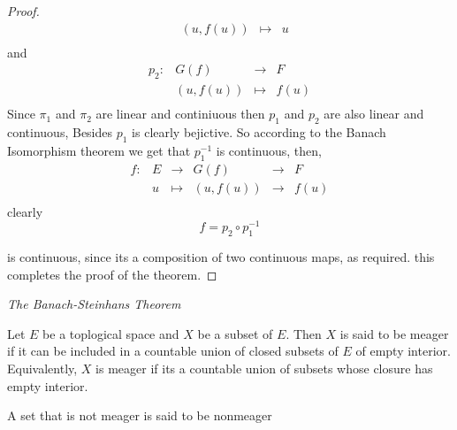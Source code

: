 \begin{proof}
\[\begin{array}{cccc}
           &  (u,f(u) )   & \longmapsto     & u \\ 
\end{array}
\]
and 
\[
\begin{array}{cccc}
      p_2 : &  G(f)   & \longrightarrow & F \\

           &  (u,f(u) )   & \longmapsto     & f(u)  \\ 
\end{array}
\]
Since $\pi _{1} $ and $\pi _{2} $ 
are linear and continiuous then $p_1 $ and $p_2 $ are 
also linear and continuous, Besides $p_1 $ is clearly
bejictive. So according to the Banach Isomorphism 
theorem we get that $p_{1}^{-1} $  is continuous, then,
\[
\begin{array}{cccccc}
	f : &  E  & \longrightarrow & G(f) &\longrightarrow & F  \\
	    &    u& \longmapsto     &  (u,f(u) )&\longrightarrow & f(u)\\ 
\end{array}
\]
clearly 
\[
f = p_{2} \circ  p_1^{-1}
\]

is continuous, since its a composition of two continuous maps,
as required. this completes the proof of the theorem.
\end{proof}
\begin{center}
	\it The Banach-Steinhans Theorem \normalfont
\end{center}
\begin{definition}
	Let $E $ be a toplogical space and $X $ be 
	a subset of $E $. Then $X $ is said to
	be meager if it can be included in a countable
	union of closed subsets of $E $ of empty interior. \\
	Equivalently, $X $ is meager if its a countable union of 
	subsets whose closure has empty interior.
\end{definition}
A set that is not meager is said to be nonmeager 
